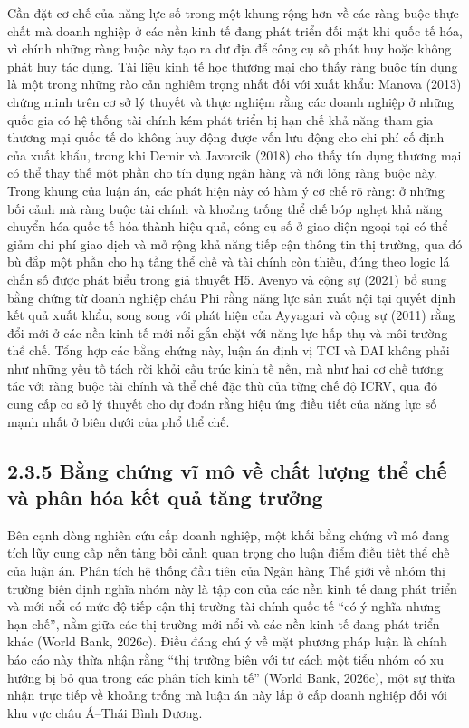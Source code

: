 \documentclass[
  a4paper,
  13pt]{extreport}
\begin{document}
Cần đặt cơ chế của năng lực số trong một khung rộng hơn về các ràng buộc
thực chất mà doanh nghiệp ở các nền kinh tế đang phát triển đối mặt khi
quốc tế hóa, vì chính những ràng buộc này tạo ra dư địa để công cụ số
phát huy hoặc không phát huy tác dụng. Tài liệu kinh tế học thương mại
cho thấy ràng buộc tín dụng là một trong những rào cản nghiêm trọng nhất
đối với xuất khẩu: Manova (2013) chứng minh trên cơ sở lý thuyết và thực
nghiệm rằng các doanh nghiệp ở những quốc gia có hệ thống tài chính kém
phát triển bị hạn chế khả năng tham gia thương mại quốc tế do không huy
động được vốn lưu động cho chi phí cố định của xuất khẩu, trong khi
Demir và Javorcik (2018) cho thấy tín dụng thương mại có thể thay thế
một phần cho tín dụng ngân hàng và nới lỏng ràng buộc này. Trong khung
của luận án, các phát hiện này có hàm ý cơ chế rõ ràng: ở những bối cảnh
mà ràng buộc tài chính và khoảng trống thể chế bóp nghẹt khả năng chuyển
hóa quốc tế hóa thành hiệu quả, công cụ số ở giao diện ngoại tại có thể
giảm chi phí giao dịch và mở rộng khả năng tiếp cận thông tin thị
trường, qua đó bù đắp một phần cho hạ tầng thể chế và tài chính còn
thiếu, đúng theo logic lá chắn số được phát biểu trong giả thuyết H5.
Avenyo và cộng sự (2021) bổ sung bằng chứng từ doanh nghiệp châu Phi
rằng năng lực sản xuất nội tại quyết định kết quả xuất khẩu, song song
với phát hiện của Ayyagari và cộng sự (2011) rằng đổi mới ở các nền kinh
tế mới nổi gắn chặt với năng lực hấp thụ và môi trường thể chế. Tổng hợp
các bằng chứng này, luận án định vị TCI và DAI không phải như những yếu
tố tách rời khỏi cấu trúc kinh tế nền, mà như hai cơ chế tương tác với
ràng buộc tài chính và thể chế đặc thù của từng chế độ ICRV, qua đó cung
cấp cơ sở lý thuyết cho dự đoán rằng hiệu ứng điều tiết của năng lực số
mạnh nhất ở biên dưới của phổ thể chế.

\hypertarget{bux1eb1ng-chux1ee9ng-vux129-muxf4-vux1ec1-chux1ea5t-lux1b0ux1ee3ng-thux1ec3-chux1ebf-vuxe0-phuxe2n-huxf3a-kux1ebft-quux1ea3-tux103ng-trux1b0ux1edfng}{%
\subsection{2.3.5 Bằng chứng vĩ mô về chất lượng thể chế và phân hóa kết
quả tăng
trưởng}\label{bux1eb1ng-chux1ee9ng-vux129-muxf4-vux1ec1-chux1ea5t-lux1b0ux1ee3ng-thux1ec3-chux1ebf-vuxe0-phuxe2n-huxf3a-kux1ebft-quux1ea3-tux103ng-trux1b0ux1edfng}}

Bên cạnh dòng nghiên cứu cấp doanh nghiệp, một khối bằng chứng vĩ mô
đang tích lũy cung cấp nền tảng bối cảnh quan trọng cho luận điểm điều
tiết thể chế của luận án. Phân tích hệ thống đầu tiên của Ngân hàng Thế
giới về nhóm thị trường biên định nghĩa nhóm này là tập con của các nền
kinh tế đang phát triển và mới nổi có mức độ tiếp cận thị trường tài
chính quốc tế ``có ý nghĩa nhưng hạn chế'', nằm giữa các thị trường mới
nổi và các nền kinh tế đang phát triển khác (World Bank, 2026c). Điều
đáng chú ý về mặt phương pháp luận là chính báo cáo này thừa nhận rằng
``thị trường biên với tư cách một tiểu nhóm có xu hướng bị bỏ qua trong
các phân tích kinh tế'' (World Bank, 2026c), một sự thừa nhận trực tiếp
về khoảng trống mà luận án này lấp ở cấp doanh nghiệp đối với khu vực
châu Á--Thái Bình Dương.
\end{document}
